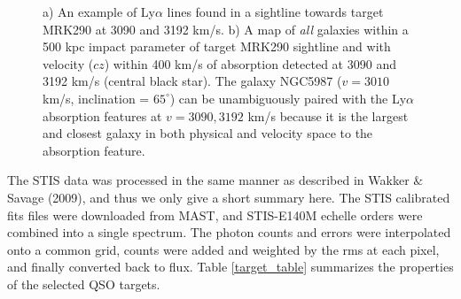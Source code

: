 \documentclass[iop]{emulateapj-rtx4}
\begin{document}
\begin{figure}[ht!]
  \caption{\small{a) An example of Ly$\alpha$ lines found in a sightline towards target MRK290 at 3090 and 3192 km/s. b) A map of \textit{all} galaxies within a 500 kpc impact parameter of target MRK290 sightline and with velocity ($cz$) within 400 km/s of absorption detected at 3090 and 3192 km/s (central black star). The galaxy NGC5987 ($v=3010$ km/s, inclination = $65^{\circ}$) can be unambiguously paired with the Ly$\alpha$ absorption features at $v=3090, 3192$ km/s because it is the largest and closest galaxy in both physical and velocity space to the absorption feature.}}
\vspace{5pt}
\end{figure}

The STIS data was processed in the same manner as described in Wakker $\&$ Savage (2009), and thus we only give a short summary here. The STIS calibrated fits files were downloaded from MAST, and STIS-E140M echelle orders were combined into a single spectrum. The photon counts and errors were interpolated onto a common grid, counts were added and weighted by the rms at each pixel, and finally converted back to flux. Table \ref{target_table} summarizes the properties of the selected QSO targets.
\end{document}
